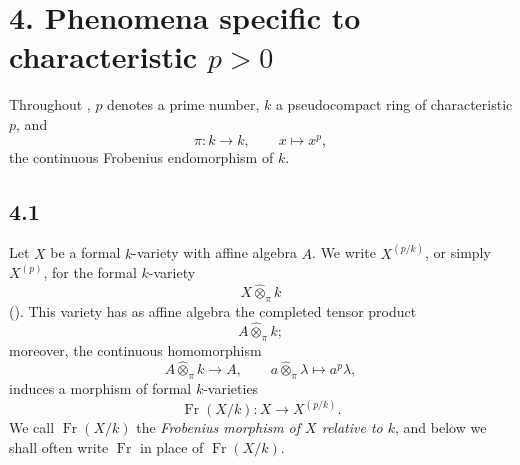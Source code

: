 
\section*{4. Phenomena specific to characteristic \(p>0\)}
\label{sga3:VIIB:4}

Throughout , \(p\) denotes a prime number, \(k\) a
pseudocompact ring of characteristic \(p\), and
\[
  \pi:k\longrightarrow k,\qquad x\longmapsto x^p,
\]
the continuous Frobenius endomorphism of \(k\).

\subsection*{4.1}
\label{sga3:VIIB:4.1}

Let \(X\) be a formal \(k\)-variety with affine algebra \(A\).
We write \(X^{(p/k)}\), or simply \(X^{(p)}\), for the formal
\(k\)-variety
\[
  X\widehat\otimes_{\pi}k
\]
\textup{()}. This variety has as affine algebra the completed tensor
product
\[
  A\widehat\otimes_{\pi}k;
\]
moreover, the continuous homomorphism
\[
  A\widehat\otimes_{\pi}k\longrightarrow A,
  \qquad
  a\widehat\otimes_{\pi}\lambda
  \longmapsto
  a^p\lambda,
\]
induces a morphism of formal \(k\)-varieties
\[
  \operatorname{Fr}(X/k):
  X\longrightarrow X^{(p/k)}.
\]
We call \(\operatorname{Fr}(X/k)\) the \emph{Frobenius morphism of
\(X\) relative to \(k\)}, and below we shall often write
\(\operatorname{Fr}\) in place of \(\operatorname{Fr}(X/k)\).

